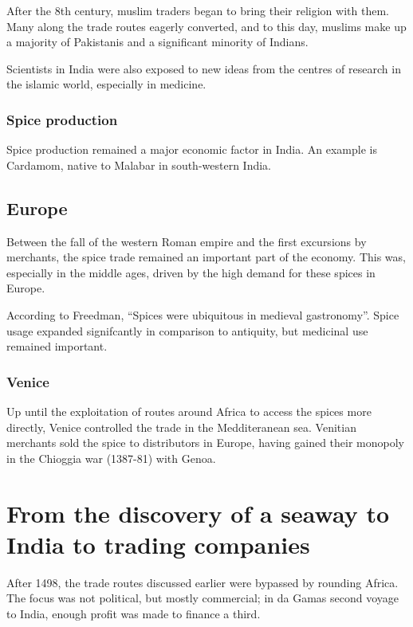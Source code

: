 \documentclass[11pt, a4paper, headings=standardclasses]{scrartcl}
\begin{document}
After the 8th century, muslim traders began to bring their religion with them.\autocite{SilkRoadIslam} Many along the trade routes eagerly converted, and to this day, muslims make up a majority of Pakistanis and a significant minority of Indians.\autocite{India}

Scientists in India were also exposed to new ideas from the centres of research in the islamic world, especially in medicine.\autocite{SilkRoadIslam}

\subsubsection{Spice production}

Spice production remained a major economic factor in India. An example is Cardamom, native to Malabar in south-western India.\autocite[71]{Rome}

\subsection{Europe}

Between the fall of the western Roman empire and the first excursions by merchants, the spice trade remained an important part of the economy.\autocite{Yale} This was, especially in the middle ages, driven by the high demand for these spices in Europe. 

According to Freedman, ``Spices were ubiquitous in medieval gastronomy''.\autocite[3]{MST} Spice usage expanded signifcantly in comparison to antiquity, but medicinal use remained important.\autocite{RIS}

\subsubsection{Venice}

Up until the exploitation of routes around Africa to access the spices more directly, Venice controlled the trade in the Medditeranean sea. Venitian merchants sold the spice to distributors in Europe, having gained their monopoly in the Chioggia war (1387-81) with Genoa.\autocite{SpiceTrade}

\section{From the discovery of a seaway to India to trading companies}

After 1498, the trade routes discussed earlier were bypassed by rounding Africa. The focus was not political, but mostly commercial; in da Gamas second voyage to India, enough profit was made to finance a third.\autocite[Section \textit{The second voyage}]{Vasco}
\end{document}
